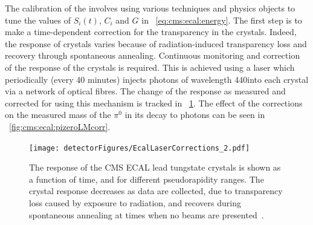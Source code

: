 The calibration of the \ECAL involves using various techniques and physics objects to tune the values of $S_{i}(t)$, $C_{i}$ and $G$ in \Eq~\ref{eq:cms:ecal:energy}. The first step is to make a time-dependent correction for the transparency in the crystals. Indeed, the response of \ECAL crystals varies because of radiation-induced transparency loss and recovery through spontaneous annealing. Continuous monitoring and correction of the response of the crystals is required. This is achieved using a laser which periodically (every 40 minutes) injects photons of wavelength 440\nm into each crystal via a network of optical fibres. The change of the response as measured and corrected for using this mechanism is tracked in \Fig~\ref{fig:cms:ecal:lasercorrections}. The effect of the corrections on the measured mass of the $\pi^0$ in its decay to photons can be seen in \Fig~\ref{fig:cms:ecal:pizeroLMcorr}.


\begin{figure}[h]
\centering
\texttt{[image: detectorFigures/EcalLaserCorrections\_2.pdf]}
\caption[The response of the CMS ECAL lead tungstate crystals is shown as a function of time, and for different pseudorapidity ranges. The crystal response decreases as data are collected, due to transparency loss caused by exposure to radiation, and recovers during spontaneous annealing at times when no beams are present\quad\cite{CMSECALPublic}.]{The response of the CMS ECAL lead tungstate crystals is shown as a function of time, and for different pseudorapidity ranges. The crystal response decreases as data are collected, due to transparency loss caused by exposure to radiation, and recovers during spontaneous annealing at times when no beams are presented~\cite{CMSECALPublic}.}
\label{fig:cms:ecal:lasercorrections}
\end{figure}

